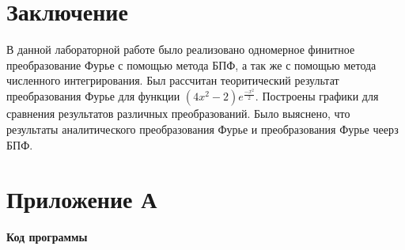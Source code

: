 \section*{Заключение}
{
	В данной лабораторной работе было реализовано одномерное финитное преобразование Фурье с помощью метода БПФ, а так же с помощью метода численного интегрирования. Был рассчитан теоритический результат преобразования Фурье для функции $(4 x^2 - 2) e^{\frac{-x^2}{2}}$. Построены графики для сравнения результатов различных преобразований. Было выяснено, что результаты аналитического преобразования Фурье и преобразования Фурье чеерз БПФ.
}
\newpage


\section*{Приложение А}
{
	\begin{center}
	\textbf{Код программы}
	\end{center}
}


